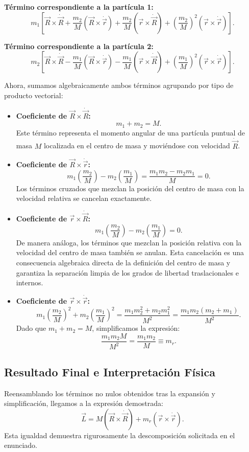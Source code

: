 \documentclass[12pt, a4paper]{article}
\begin{document}
\textbf{Término correspondiente a la partícula 1:}
$$ m_1 \left[ \vec{R} \times \dot{\vec{R}} + \frac{m_2}{M} (\vec{R} \times \dot{\vec{r}}) + \frac{m_2}{M} (\vec{r} \times \dot{\vec{R}}) + \left(\frac{m_2}{M}\right)^2 (\vec{r} \times \dot{\vec{r}}) \right]. $$

\textbf{Término correspondiente a la partícula 2:}
$$ m_2 \left[ \vec{R} \times \dot{\vec{R}} - \frac{m_1}{M} (\vec{R} \times \dot{\vec{r}}) - \frac{m_1}{M} (\vec{r} \times \dot{\vec{R}}) + \left(\frac{m_1}{M}\right)^2 (\vec{r} \times \dot{\vec{r}}) \right]. $$

Ahora, sumamos algebraicamente ambos términos agrupando por tipo de producto vectorial:

\begin{itemize}
    \item \textbf{Coeficiente de $\vec{R} \times \dot{\vec{R}}$:}
    $$ m_1 + m_2 = M. $$
    Este término representa el momento angular de una partícula puntual de masa $M$ localizada en el centro de masa y moviéndose con velocidad $\dot{\vec{R}}$.

    \item \textbf{Coeficiente de $\vec{R} \times \dot{\vec{r}}$:}
    $$ m_1 \left( \frac{m_2}{M} \right) - m_2 \left( \frac{m_1}{M} \right) = \frac{m_1 m_2 - m_2 m_1}{M} = 0. $$
    Los términos cruzados que mezclan la posición del centro de masa con la velocidad relativa se cancelan exactamente.

    \item \textbf{Coeficiente de $\vec{r} \times \dot{\vec{R}}$:}
    $$ m_1 \left( \frac{m_2}{M} \right) - m_2 \left( \frac{m_1}{M} \right) = 0. $$
    De manera análoga, los términos que mezclan la posición relativa con la velocidad del centro de masa también se anulan. Esta cancelación es una consecuencia algebraica directa de la definición del centro de masa y garantiza la separación limpia de los grados de libertad traslacionales e internos.

    \item \textbf{Coeficiente de $\vec{r} \times \dot{\vec{r}}$:}
    $$ m_1 \left( \frac{m_2}{M} \right)^2 + m_2 \left( \frac{m_1}{M} \right)^2 = \frac{m_1 m_2^2 + m_2 m_1^2}{M^2} = \frac{m_1 m_2 (m_2 + m_1)}{M^2}. $$
    Dado que $m_1 + m_2 = M$, simplificamos la expresión:
    $$ \frac{m_1 m_2 M}{M^2} = \frac{m_1 m_2}{M} \equiv m_r. $$
\end{itemize}

\subsection{Resultado Final e Interpretación Física}
Reensamblando los términos no nulos obtenidos tras la expansión y simplificación, llegamos a la expresión demostrada:
$$ \vec{L} = M \left( \vec{R} \times \dot{\vec{R}} \right) + m_r \left( \vec{r} \times \dot{\vec{r}} \right). $$
Esta igualdad demuestra rigurosamente la descomposición solicitada en el enunciado.
\end{document}
